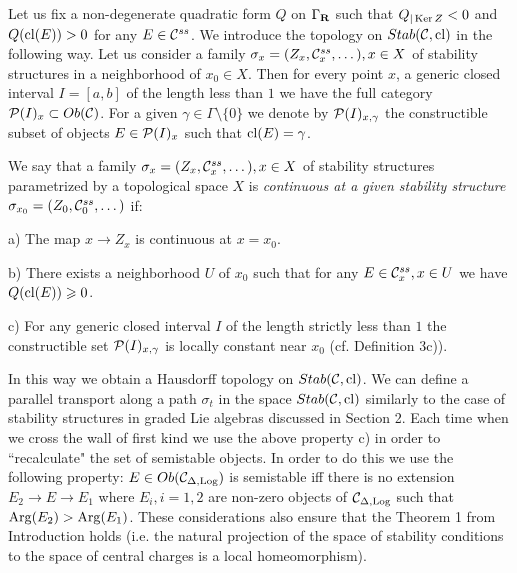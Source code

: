 \documentclass[12pt]{article}
\begin{document}
Let us fix a non-degenerate quadratic form $Q$ on $\Gamma_{{\bf R}}$ such that $Q_{|\operatorname{Ker} Z}<0$ and $Q(\operatorname{cl}(E))>0$ for any $E\in {\mathcal C}^{ss}$.
 We introduce the topology on $Stab({\mathcal C},\operatorname{cl})$ in the following way. Let us consider a family
$\sigma_x=(Z_x,{\mathcal C}^{ss}_x,\dots), x\in X$ of stability structures in a neighborhood of $x_0\in X$.
Then for every point $x$, a generic closed interval $I=[a,b]$ of the length less than $1$  we have the full category ${\cal P}(I)_x\subset Ob({\mathcal C})$.
 For a given $\gamma\in \Gamma\setminus\{0\}$ we denote by ${\cal P}(I)_{x,\gamma}$ the constructible subset of objects $E\in {\cal P}(I)_x $ such that $\operatorname{cl}(E)=\gamma$.

We say that a  family $\sigma_x=(Z_x,{\mathcal C}^{ss}_x,\dots), x\in X$ of stability structures parametrized by a topological space $X$
is {\it continuous at a given stability structure $\sigma_{x_0}=(Z_0,{\mathcal C}^{ss}_0,\dots)$ } if:

a) The map $x\to Z_x$ is continuous at $x=x_0$.

b) There exists a neighborhood $U$ of $x_0$ such that for any $E\in {\mathcal C}^{ss}_x, x\in U$ we have $Q(\operatorname{cl}(E))\geqslant 0$.





c) For any generic closed interval $I$ of the length strictly less than $1$ the
constructible set ${\cal P}(I)_{x,\gamma}$ is locally constant near $x_0$ (cf. Definition 3c)).







In this way we obtain a Hausdorff topology on $Stab({\mathcal C},\operatorname{cl})$.
We can define a parallel transport along a path $\sigma_t$ in the space $Stab({\mathcal C},\operatorname{cl})$ similarly to
the case of  stability structures in graded Lie algebras discussed in Section 2. Each time when we cross the wall
of first kind we use the above property c) in order to ``recalculate" the set
of semistable objects. In order to do this we use the following property:
$E\in Ob({\mathcal C}_{{\Delta},\operatorname{Log}})$ is semistable iff there is no extension $E_2\to E\to E_1$ where $E_i,i=1,2$ are
non-zero objects
of ${\mathcal C}_{{\Delta},\operatorname{Log}}$ such that $\operatorname{Arg}(E_2)>\operatorname{Arg}(E_1)$. These considerations also ensure that the Theorem 1 from Introduction holds
(i.e. the natural projection of the space of stability conditions to the space of central charges is a local homeomorphism).
\end{document}
